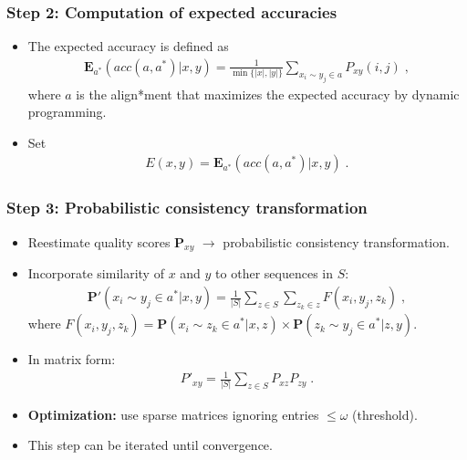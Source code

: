 \begin{frame}
    \frametitle{Step 2: Computation of expected accuracies}
    \begin{itemize}
        \item The expected accuracy is defined as
        \begin{align*}
            \pmb{E}_{a^*} (acc(a,a^*)|x,y) = \frac{1}{\min{\{|x|,|y|\}}} \sum_{x_i\sim y_j \in a} P_{xy}(i,j) \;,
        \end{align*}
        where $a$ is the align*ment that maximizes the expected accuracy by dynamic programming.
        \item Set 
        \begin{align}\label{eq:score}
            E(x,y) = \pmb{E}_{a^*} (acc(a,a^*)|x,y) \;.
        \end{align}
    \end{itemize}
\end{frame}

\begin{frame}
    \frametitle{Step 3: Probabilistic consistency transformation}
    \begin{itemize}
        \item Reestimate quality scores $\pmb{P}_{xy}$ $\rightarrow$ probabilistic consistency transformation.
        \item Incorporate similarity of $x$ and $y$ to other sequences in $S$:
        \begin{align*}
            {\pmb{P}}'(x_i \sim y_j \in a^* | x, y) = \frac{1}{|S|} \sum_{z\in S} \sum_{z_k \in z} F(x_i, y_j, z_k) \;,
        \end{align*}
        where $F(x_i, y_j, z_k) =  {\pmb{P}}(x_i \sim z_k \in a^* | x, z) \times {\pmb{P}}(z_k \sim y_j \in a^* | z, y) $.
        \item In matrix form:
        \begin{align*}
            {P'}_{xy} = \frac{1}{|S|} \sum_{z\in S} P_{xz}P_{zy} \;.
        \end{align*}
        \item \textbf{Optimization: }use sparse matrices ignoring entries $\leq \omega$ (threshold).
        \item This step can be iterated until convergence.
    \end{itemize}
\end{frame}

